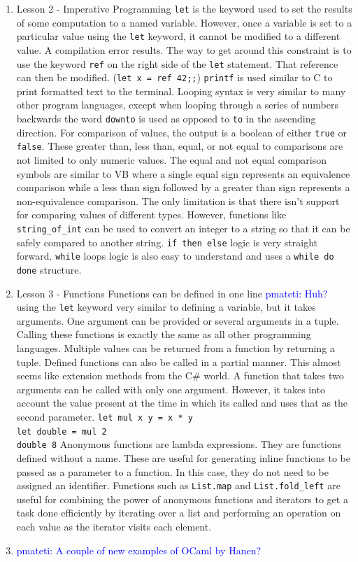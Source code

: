 \documentclass{article}
\newcommand{\PM}[1]{\textcolor{Blue}{pmateti: #1}}%
\begin{document}
\begin{enumerate}
\item Lesson 2 - Imperative Programming 
  \texttt{let} is the keyword used to set the results of some computation to a named variable. However, once a variable is set to a particular value using the \texttt{let} keyword, it cannot be modified to a different value. A compilation error results. The way to get around this constraint is to use the keyword \texttt{ref} on the right side of the \texttt{let} statement. That reference can then be modified. (\texttt{let x = ref 42;;}) 
  \texttt{printf} is used similar to C to print formatted text to the terminal. 
  Looping syntax is very similar to many other program languages, except when looping through a series of numbers backwards the word \texttt{downto} is used as opposed to \texttt{to} in the ascending direction. 
  For comparison of values, the output is a boolean of either \texttt{true} or \texttt{false}. These greater than, less than, equal, or not equal to comparisons are not limited to only numeric values. The equal and not equal comparison symbols are similar to VB where a single equal sign represents an equivalence comparison while a less than sign followed by a greater than sign represents a non-equivalence comparison. The only limitation is that there isn't support for comparing values of different types. However, functions like \verb|string_of_int| can be used to convert an integer to a string so that it can be safely compared to another string. 
  \texttt{if then else} logic is very straight forward. 
  \texttt{while} loops logic is also easy to understand and uses a \texttt{while do done} structure.
\item Lesson 3 - Functions Functions can be defined in one line
  \PM{Huh?} using the \texttt{let} keyword very similar to defining a
  variable, but it takes arguments. One argument can be provided or
  several arguments in a tuple. Calling these functions is exactly the
  same as all other programming languages. Multiple values can be
  returned from a function by returning a tuple.  Defined functions
  can also be called in a partial manner. This almost seems like
  extension methods from the C\# world. A function that takes two
  arguments can be called with only one argument. However, it takes
  into account the value present at the time in which its called and
  uses that as the second parameter.  \texttt{let mul x y = x * y
    \\ let double = mul 2 \\ double 8} Anonymous functions are lambda
  expressions. They are functions defined without a name. These are
  useful for generating inline functions to be passed as a parameter
  to a function. In this case, they do not need to be assigned an
  identifier.  Functions such as \texttt{List.map} and
  \verb|List.fold_left| are useful for combining the power of
  anonymous functions and iterators to get a task done efficiently by
  iterating over a list and performing an operation on each value as
  the iterator visits each element.
\item
  \PM{A couple of new examples of OCaml by Hanen?}
\end{enumerate}
\end{document}
